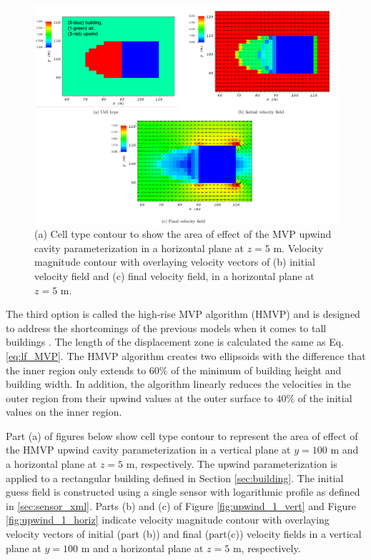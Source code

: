 \begin{figure}[H]
    \centering
    \includegraphics[width=\textwidth]{Images/upwind_z_5_2.pdf}
    \caption{(a) Cell type contour to show the area of effect of the MVP upwind cavity parameterization in a horizontal plane at $z=5$ m. Velocity magnitude contour with overlaying velocity vectors of (b) initial velocity field and (c) final velocity field, in a horizontal plane at $z=5$ m.}
\end{figure}

The third option is called the high-rise MVP algorithm (HMVP) and is designed to address the shortcomings of the previous models when it comes to tall buildings  \cite{nelson20085}. The length of the displacement zone is calculated the same as Eq. \ref{eq:lf_MVP}. The HMVP algorithm creates two ellipsoids with the difference that the inner region only extends to $60\%$ of the minimum of building height and building width. In addition, the algorithm linearly reduces the velocities in the outer region from their upwind values at the outer surface to $40\%$ of the initial values on the inner region.

Part (a) of figures below show cell type contour to represent the area of effect of the HMVP upwind cavity parameterization in a vertical plane at $y=100$ m and a horizontal plane at $z=5$ m, respectively. The upwind parameterization is applied to a rectangular building defined in Section \ref{sec:building}. The initial guess field is constructed using a single sensor with logarithmic profile as defined in \ref{sec:sensor_xml}. Parts (b) and (c) of Figure \ref{fig:upwind_1_vert} and Figure \ref{fig:upwind_1_horiz} indicate velocity magnitude contour with overlaying velocity vectors of initial (part (b)) and final (part(c)) velocity fields in a vertical plane at $y=100$ m and a horizontal plane at $z=5$ m, respectively.


